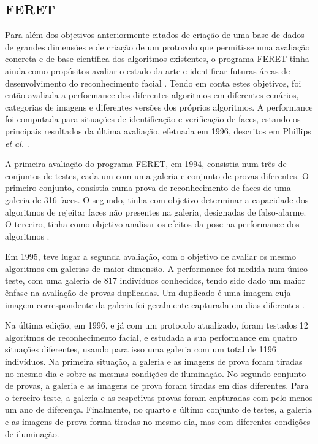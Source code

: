 \subsection{FERET}
Para além dos objetivos anteriormente citados de criação de uma base de dados de grandes dimensões e de criação de um protocolo que permitisse uma avaliação concreta e de base científica dos algoritmos existentes, o programa FERET tinha ainda como propósitos avaliar o estado da arte e identificar futuras áreas de desenvolvimento do reconhecimento facial \cite{Phillips2000}. Tendo em conta estes objetivos, foi então avaliada a performance dos diferentes algoritmos em diferentes cenários, categorias de imagens e diferentes versões dos próprios algoritmos. A performance foi computada para situações de identificação e verificação de faces, estando os principais resultados da última avaliação, efetuada em 1996, descritos em Phillips \textit{et al.} \cite{Phillips2000}.

A primeira avaliação do programa FERET, em 1994, consistia num três de conjuntos de testes, cada um com uma galeria e conjunto de provas diferentes. O primeiro conjunto, consistia numa prova de reconhecimento de faces de uma galeria de 316 faces. O segundo, tinha com objetivo determinar a capacidade dos algoritmos de rejeitar faces não presentes na galeria, designadas de falso-alarme. O terceiro, tinha como objetivo analisar os efeitos da pose na performance dos algoritmos \citep{Phillips2000}.

Em 1995, teve lugar a segunda avaliação, com o objetivo de  avaliar os mesmo algoritmos em galerias de maior dimensão. A performance foi medida num único teste, com uma galeria de 817 indivíduos conhecidos, tendo sido dado um maior ênfase na avaliação de provas duplicadas. Um duplicado é uma imagem cuja imagem correspondente da galeria foi geralmente capturada em dias diferentes  \citep{Phillips2000}.

Na última edição, em 1996, e já com um protocolo atualizado, foram testados 12 algoritmos de reconhecimento facial, e estudada a sua performance em quatro situações diferentes, usando para isso uma galeria com um total de 1196 indivíduos. Na primeira situação, a galeria e as imagens de prova foram tiradas no mesmo dia e sobre as mesmas condições de iluminação. No segundo conjunto de provas, a galeria e as imagens de prova foram tiradas em dias diferentes. Para o terceiro teste, a galeria e as respetivas provas foram capturadas com pelo menos um ano de diferença. Finalmente, no quarto e último conjunto de testes, a galeria e as imagens de prova forma tiradas no mesmo dia, mas com diferentes condições de iluminação.

